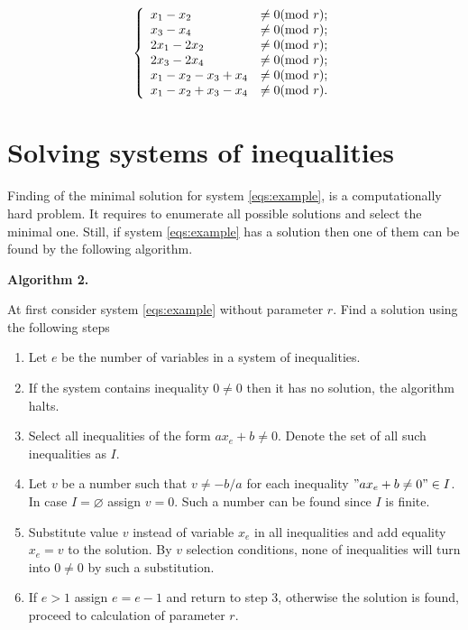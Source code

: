 \documentclass[14pt]{mmcs-article}
\begin{document}
\begin{equation}
    \centering
    \left\{
        \begin{array}{ll}
            x_1 - x_2 &\neq 0             (\mod{r}) ; \\
            x_3 - x_4 &\neq 0             (\mod{r}) ; \\
            2 x_1 - 2 x_2 &\neq 0         (\mod{r}) ; \\
            2 x_3 - 2 x_4 &\neq 0         (\mod{r}) ; \\
            x_1 - x_2 - x_3 + x_4 &\neq 0 (\mod{r}) ; \\
            x_1 - x_2 + x_3 - x_4 &\neq 0 (\mod{r}) . \\
        \end{array}
        \label{eqs:cycle_search_neqs}
    \right.
\end{equation}

\section{Solving systems of inequalities}



Finding of the minimal solution for system \eqref{eqs:example}, is a computationally hard problem. It requires to enumerate all possible solutions and select the minimal one. Still, if system \eqref{eqs:example} has a solution then one of them can be found by the following algorithm.

\textbf{Algorithm 2.}

At first consider system \eqref{eqs:example} without parameter $r$. Find a solution using the following steps

\begin{enumerate}
    \item Let $e$ be the number of variables in a system of inequalities.
    \item If the system contains inequality $0 \neq 0$ then it has no solution, the algorithm halts.
    \item Select all inequalities of the form $a x_e + b \neq 0$. Denote the set of all such inequalities as $I$.
    \item Let $v$ be a number such that $v \neq -b/a $ for each inequality $"a x_e + b \neq 0" \in I$. In case $I = \varnothing$ assign $v = 0$. Such a number can be found since $I$ is finite.
    \item Substitute value $v$ instead of variable $x_e$ in all inequalities and add equality $x_e = v$ to the solution. By $v$ selection conditions, none of inequalities will turn into $0 \neq 0$ by such a substitution. 
    \item If $e > 1$ assign $e = e - 1$ and return to step 3, otherwise the solution is found, proceed to calculation of parameter $r$.
\end{enumerate}
\end{document}
